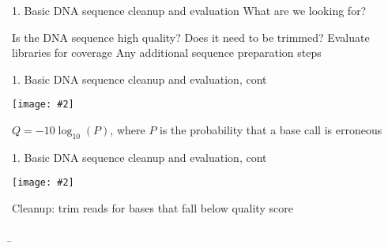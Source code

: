 \documentclass{beamer}
\renewcommand{\c}[1]{\begin{center}#1\end{center}}
\newcommand{\gr}[2][.95]{\c{\texttt{[image: \#2]}}}
\begin{document}
\begin{frame}{1. Basic DNA sequence cleanup and evaluation}
What are we looking for?
\begin{outline}
    \1 Is the DNA sequence high quality? Does it need to be trimmed?
    \1 Evaluate libraries for coverage
    \1 Any additional sequence preparation steps
\end{outline}
\end{frame}

\begin{frame}{1. Basic DNA sequence cleanup and evaluation, cont}
\gr{l4_figs/s8_scores.png}
$Q = -10 \log_{10}(P)$, where $P$ is the probability that a base call is erroneous
\end{frame}

\begin{frame}{1. Basic DNA sequence cleanup and evaluation, cont}
\gr{l4_figs/s9_fastq.png}
Cleanup: trim reads for bases that fall below quality score
\end{frame}

\b
\end{document}
